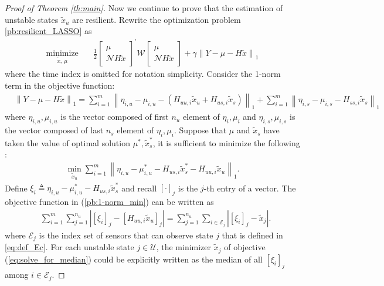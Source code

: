 \documentclass[12pt]{article}  %
\newcommand{\Ec}{{\mathcal{E}}} %
\newcommand{\Uc}{{\mathcal{U}}}
\newcommand{\Nc}{{\mathcal{N}}}
\newcommand{\Wc}{{\mathcal{W}}}
\newtheorem*{proof}{\textbf{Proof}}
\begin{document}
\begin{proof}[Proof of Theorem \ref{th:main}]
	Now we continue to prove that the estimation of unstable states $\tilde{x}_u$ are resilient.
	Rewrite the optimization problem \eqref{pb:resilient_LASSO} as 
	\begin{align*}
	\underset{{\tilde{x}},\ \mu}{\text{minimize}}&\quad \frac{1}{2} 
	\begin{bmatrix}
	\mu \\
	\Nc H \tilde{x}
	\end{bmatrix}^{'} \Wc
	\begin{bmatrix}
	\mu \\
	\Nc H \tilde{x}
	\end{bmatrix} + \gamma\left\|{Y}-\mu-H \tilde{x}\right\|_1 
	\end{align*}
	where the time index is omitted for notation simplicity.
	Consider the 1-norm term in the objective function:
	\begin{align*}
	&\left\| {Y}-\mu-H \tilde{x} \right\|_1
	=\sum_{i=1}^{m} 
	\left\|\eta_{i,u}-\mu_{i,u}-(H_{uu,i} \tilde{x}_u + H_{us,i} \tilde{x}_s) \right\|_1 
	+ \sum_{i=1}^{m} \left\|\eta_{i,s}-\mu_{i,s}- H_{ss,i} \tilde{x}_s \right\|_1 
	\end{align*}
	where $\eta_{i,u}, \mu_{i,u}$ is the vector composed of first $n_u$ element of $\eta_{i}, \mu_{i}$ and 
	$\eta_{i,s}, \mu_{i,s}$ is the vector composed of last $n_s$ element of $\eta_{i}, \mu_{i}$.
	Suppose that $\mu$ and $\tilde{x}_s$ have taken the value of optimal solution $\mu^*, \tilde{x}_s^*$, it is sufficient to minimize the following :
	\begin{align}\label{pb:1-norm_min}
	\min_{\tilde{x}_u} \sum_{i=1}^{m} \left\|\eta_{i,u}-\mu^*_{i,u}- H_{us,i} \tilde{x}^*_s - H_{uu,i} \tilde{x}_u \right\|_1  .
	\end{align}
	Define $\xi_i\triangleq \eta_{i,u}-\mu^*_{i,u}- H_{us,i} \tilde{x}^*_s $ and recall $[\cdot]_j$ is the $j$-th entry of a vector. The objective function in (\ref{pb:1-norm_min}) can be written as 
	\begin{align}
	&\sum_{i=1}^{m}\sum_{j=1}^{n_u} \left| [\xi_i]_j -[H_{uu,i} \tilde{x}_u]_j \right| 
	=\sum_{j=1}^{n_u}\sum_{i\in\Ec_j} \left| [\xi_i]_j -\tilde{x}_j \right| . \label{eq:solve_for_median}
	\end{align}
	where $\Ec_j$ is the index set of sensors that can observe state $j$ that is defined in \eqref{eq:def_Ec}.
	For each unstable state $j\in\Uc$, the minimizer $\tilde{x}_j$ of objective (\ref{eq:solve_for_median}) could be explicitly written as the median of all $[\xi_i]_j$ among $i\in\Ec_j$.
	

\end{proof}
\end{document}
